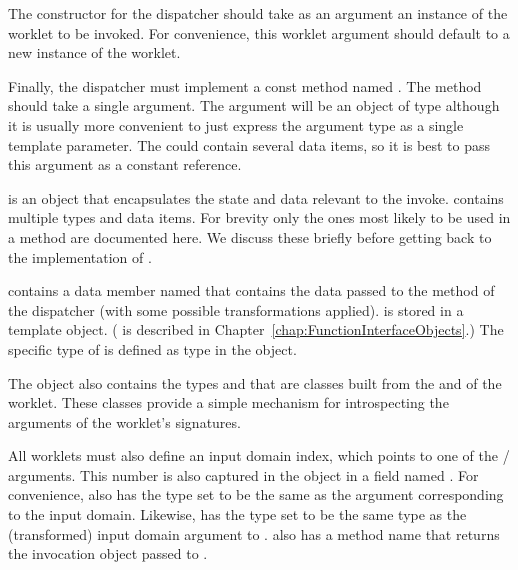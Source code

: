 
The constructor for the dispatcher should take as an argument an instance of the worklet to be invoked.
For convenience, this worklet argument should default to a new instance of the worklet.


Finally, the dispatcher must implement a const method named .
The  method should take a single argument.
The argument will be an object of type  although it is usually more convenient to just express the argument type as a single template parameter.
The  could contain several data items, so it is best to pass this argument as a constant reference.



 is an object that encapsulates the state and data relevant to the invoke.
 contains multiple types and data items.
For brevity only the ones most likely to be used in a  method are documented here.
We discuss these briefly before getting back to the implementation of .

 contains a data member named  that contains the data passed to the  method of the dispatcher (with some possible transformations applied).
 is stored in a  template object.
( is described in Chapter~\ref{chap:FunctionInterfaceObjects}.)
The specific type of  is defined as type  in the  object.

The  object also contains the types  and  that are  classes built from the \controlsignature and \executionsignature of the worklet.
These  classes provide a simple mechanism for introspecting the arguments of the worklet's signatures.

All worklets must also define an input domain index, which points to one of the \controlsignature/ arguments.
This number is also captured in the  object in a field named .
For convenience,  also has the type  set to be the same as the \controlsignature argument corresponding to the input domain.
Likewise,  has the type  set to be the same type as the (transformed) input domain argument to .
 also has a method name  that returns the invocation object passed to .

